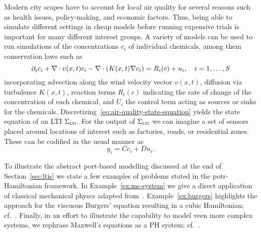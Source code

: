 \begin{example}
    Modern city scapes have to account for local air quality for several reasons such as health issues, policy-making, and economic factors.
    Thus, being able to simulate different settings in cheap models before running expensive trials is important for many different interest groups.
    A variety of models can be used to run simulations of the concentrations $c_i$ of individual chemicals, among them conservation laws such as
    \begin{equation}\label{eq:air-quality-state-equation}
        \pd[t]{} c_i + \nabla \cdot v(x, t) c_i - \nabla \cdot (K(x, t) \nabla c_i) = R_i(c) + u_i,\quad i = 1, \dots, S
    \end{equation}
    incorporating advection along the wind velocity vector $v(x, t)$, diffusion via turbulence $K(x, t)$, reaction terms $R_i(c)$ indicating the rate of change of the concentration of each chemical, and $U_i$ the control term acting as sources or sinks for the chemicals.
    Discretizing~\eqref{eq:air-quality-state-equation} yields the state equation of an \ac{LTI} $\Sigma_{\msc{lti}}$.
    For the output of $\Sigma_{\msc{lti}}$ we can imagine a set of sensors placed around locations of interest such as factories, roads, or residential zones.
    These can be codified in the usual manner as
    \begin{equation*}
        y_i = C c_i + D u_i.
    \end{equation*}

\end{example}

To illustrate the abstract port-based modelling discussed at the end of Section~\ref{sec:ltis} we state a few examples of problems stated in the potr-Hamiltonian framework.
In Example~\ref{ex:ms-system} we give a direct application of classical mechanical physcs adapted from~\cite[Example~2.1]{VanDerSchaft2014}.
Example~\ref{ex:burgers} highlights the approach for the viscuous Burgers' equation resulting in a cubic Hamiltonian; cf.~\cite[Example~2.1]{Maschke2005}.
Finally, in an effort to illustrate the capability to model veen more complex systems, we rephrase Maxwell's equations as a \ac{PH} system; cf.~\cite[Section~2]{Haine2022}.



